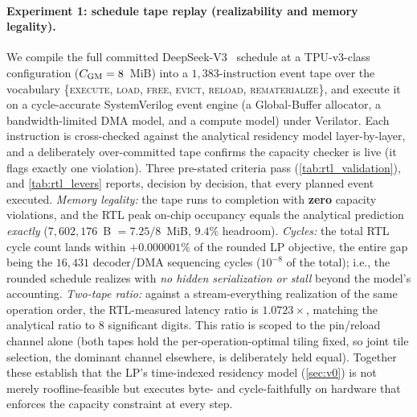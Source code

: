 \paragraph{Experiment 1: schedule tape replay (realizability and memory
legality).}
We compile the full committed DeepSeek-V3~\citep{deepseekv3report} schedule
at a TPU-v3-class configuration ($C_{\text{GM}} = 8$~MiB) into a $1{,}383$-instruction
event tape over the vocabulary \{\textsc{execute}, \textsc{load},
\textsc{free}, \textsc{evict}, \textsc{reload}, \textsc{rematerialize}\}, and
execute it on a cycle-accurate SystemVerilog event engine (a Global-Buffer
allocator, a bandwidth-limited DMA model, and a compute model) under
Verilator. Each instruction is cross-checked against the analytical residency
model layer-by-layer, and a deliberately over-committed tape confirms the
capacity checker is live (it flags exactly one violation). Three pre-stated
criteria pass (\cref{tab:rtl_validation}), and \cref{tab:rtl_levers} reports, decision by
decision, that every planned event executed. \emph{Memory legality:} the tape
runs to completion with \textbf{zero} capacity violations, and the RTL peak
on-chip occupancy equals the analytical prediction \emph{exactly}
($7{,}602{,}176$~B $= 7.25/8$~MiB, $9.4\%$ headroom). \emph{Cycles:} the total
RTL cycle count lands within $+0.000001\%$ of the rounded LP objective, the
entire gap being the $16{,}431$ decoder/DMA sequencing cycles ($10^{-8}$ of
the total); i.e., the rounded schedule realizes with \emph{no hidden
serialization or stall} beyond the model's accounting. \emph{Two-tape ratio:}
against a stream-everything realization of the same operation order, the
RTL-measured latency ratio is $1.0723\times$, matching the analytical ratio to
$8$ significant digits. This ratio is scoped to the pin/reload channel alone
(both tapes hold the per-operation-optimal tiling fixed, so joint tile
selection, the dominant channel elsewhere, is deliberately held equal).
Together these establish that the LP's time-indexed residency model
(\cref{sec:v0}) is not merely roofline-feasible but executes byte- and
cycle-faithfully on hardware that enforces the capacity constraint at every
step.


